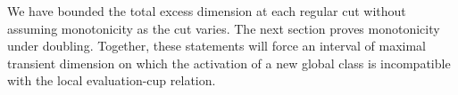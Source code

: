 We have bounded the total excess dimension at each regular cut without
assuming monotonicity as the cut varies.  The next section proves
monotonicity under doubling.  Together, these statements will force an
interval of maximal transient dimension on which the activation of a
new global class is incompatible with the local evaluation-cup relation.
